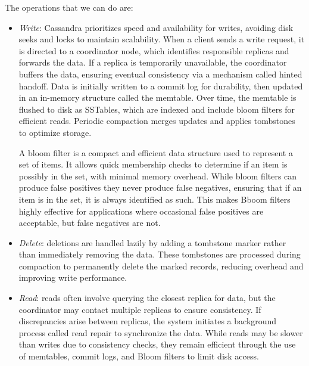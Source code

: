 The operations that we can do are: 
\begin{itemize}
    \item \textit{Write}: Cassandra prioritizes speed and availability for writes, avoiding disk seeks and locks to maintain scalability.
    When a client sends a write request, it is directed to a coordinator node, which identifies responsible replicas and forwards the data. 
        If a replica is temporarily unavailable, the coordinator buffers the data, ensuring eventual consistency via a mechanism called hinted handoff.
        Data is initially written to a commit log for durability, then updated in an in-memory structure called the memtable. 
        Over time, the memtable is flushed to disk as SSTables, which are indexed and include bloom filters for efficient reads. 
        Periodic compaction merges updates and applies tombstones to optimize storage.
    
        A bloom filter is a compact and efficient data structure used to represent a set of items. 
        It allows quick membership checks to determine if an item is possibly in the set, with minimal memory overhead.
        While bloom filters can produce false positives they never produce false negatives, ensuring that if an item is in the set, it is always identified as such. 
        This makes Bboom filters highly effective for applications where occasional false positives are acceptable, but false negatives are not.
    \item \textit{Delete}: deletions are handled lazily by adding a tombstone marker rather than immediately removing the data. 
        These tombstones are processed during compaction to permanently delete the marked records, reducing overhead and improving write performance.
    \item \textit{Read}: reads often involve querying the closest replica for data, but the coordinator may contact multiple replicas to ensure consistency. 
        If discrepancies arise between replicas, the system initiates a background process called read repair to synchronize the data. 
        While reads may be slower than writes due to consistency checks, they remain efficient through the use of memtables, commit logs, and Bloom filters to limit disk access.
\end{itemize}

